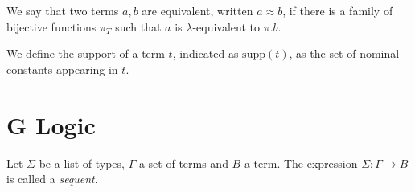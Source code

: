 \documentclass[a4paper]{article}
\theoremstyle{definition}
\newcommand*{\sequent}[3]{#1; #2 \longrightarrow #3}
\newcommand*{\nommap}[2]{#1. #2}
\newcommand*{\supp}[1]{\mathrm{supp}(#1)}
\newcommand*{\listapp}[2]{#1 \, #2}
\newcommand*{\listcons}[2]{#1, #2}
\begin{document}
We say that two terms $a, b$ are equivalent, written $a \approx b$, if there is a family of bijective functions $\pi_T$ such that $a$ is $\lambda$-equivalent to $\nommap{\pi}{b}$.

We define the support of a term $t$, indicated as $\supp{t}$, as the set of nominal constants appearing in $t$.


\section{G Logic}

Let $\Sigma$ be a list of types, $\Gamma$ a set of terms and $B$ a term.
The expression $\sequent{\Sigma}{\Gamma}{B}$ is called a \emph{sequent}.
\end{document}

